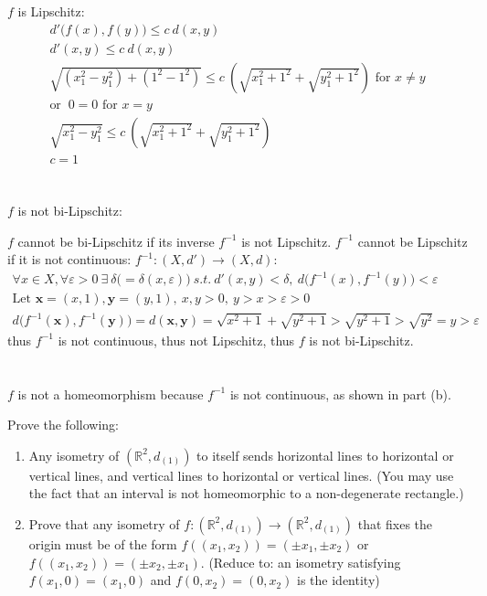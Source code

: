 \documentclass{jhwhw}
\begin{document}
\solution{}
\part{}
$f$ is Lipschitz:
\begin{gather}
d'\big(f(x),f(y)\big) \le c\: d(x,y)\\
d'(x,y) \le c \: d(x,y)\\
\sqrt{(x_1^2-y_1^2)+(1^2-1^2)} \le c\: \left(\sqrt{x_1^2+1^2}+\sqrt{y_1^2+1^2}\right) \text{ for } x\ne y\\
 \text{or }\:0=0 \text{ for } x= y\\
\sqrt{x_1^2-y_1^2} \le c\: \left(\sqrt{x_1^2+1^2}+\sqrt{y_1^2+1^2}\right)\\
c = 1 
\end{gather}
\part{}
$f$ is not bi-Lipschitz:

$f$ cannot be bi-Lipschitz if its inverse $f^{-1}$ is not Lipschitz. $f^{-1}$ cannot be Lipschitz if it is not continuous:
$f^{-1}:(X,d')\to(X,d)$:
\begin{gather}
\forall x\in X,\forall \varepsilon >0 \:\exists \:\delta \big(=\delta (x,\varepsilon) \big)\: s.t.\: d'(x,y) < \delta, \: d\big(f^{-1}(x),f^{-1}(y)\big) < \varepsilon \\
\text{Let } \mathbf{x}=(x,1), \mathbf{y}=(y,1),\: x,y>0,\:y>x>\varepsilon>0\\
d\big(f^{-1}(\mathbf{x}),f^{-1}(\mathbf{y})\big) =d(\mathbf{x},\mathbf{y})= \sqrt{x^2 +1}+\sqrt{y^2+1}> \sqrt{y^2+1} > \sqrt{y^2} =y>\varepsilon
\end{gather}
thus $f^{-1}$ is not continuous, thus not Lipschitz, thus $f$ is not bi-Lipschitz.



\part{}
$f$ is not a homeomorphism because $f^{-1}$ is not continuous, as shown in part (b).


\problem{}%
 Prove the following: 
 \begin{enumerate}
	\item Any isometry of $(\mathbb{R}^2,d_{(1)})$  to itself sends horizontal lines to horizontal or vertical lines, and vertical lines to horizontal or vertical lines.
	(You may use the fact that an interval is not homeomorphic to a non-degenerate rectangle.)
	
	\item Prove that any isometry of $f:(\mathbb{R}^2,d_{(1)})\to (\mathbb{R}^2,d_{(1)})$ that fixes the origin must be of the form $f((x_1,x_2) )= (\pm x_1,\pm x_2)$ or $f((x_1,x_2)) = (\pm x_2, \pm x_1)$.  (Reduce to: an isometry satisfying $f(x_1,0) = (x_1,0)$ and $f(0,x_2) = (0,x_2)$ is the identity)
\end{enumerate}
\end{document}
